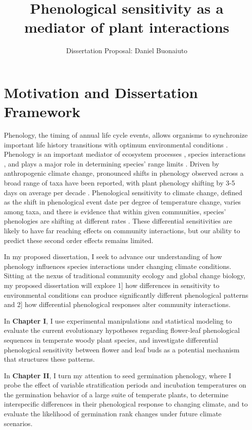 \documentclass[12pt]{article}\usepackage[]{graphicx}\usepackage[]{color}
\begin{document}
\title{Phenological sensitivity as a mediator of plant interactions}
\author{Dissertation Proposal: Daniel Buonaiuto}
\maketitle{}
\section*{Motivation and Dissertation Framework}
\indent\indent Phenology, the timing of annual life cycle events, allows organisms to synchronize important life history transitions with optimum environmental conditions \citep{Forrest2010}. Phenology is an important mediator of ecosystem processes \citep{Piao2007,Cleland2007}, species interactions \citep{Yang2010,Leverett2017}, and plays a major role in determining species' range limits \citep{Chuine2001}. Driven by anthropogenic climate change, pronounced shifts in phenology observed across a broad range of taxa have been reported, with plant phenology shifting by 3-5 days on average per decade \citep{Parmesan2003,Menzel2006,Root2003}. Phenological sensitivity to climate change, defined as the shift in phenological event date per degree of temperature change, varies among taxa, and there is evidence that within given communities, species' phenologies are shifting at different rates \citep{Cleland2012,Ovaskainen2013}. These differential sensitivities are likely to have far reaching effects on community interactions, but our ability to predict these second order effects remains limited.
\par In my proposed dissertation, I seek to advance our understanding of how phenology influences species interactions under changing climate conditions. Sitting at the nexus of traditional community ecology and global change biology, my proposed dissertation will explore 1] how differences in sensitivity to environmental conditions can produce significantly different phenological patterns and 2] how differential phenological responses alter community interactions.
\par In \textbf{Chapter I}, I use experimental manipulations and statistical modeling to evaluate the current evolutionary hypotheses regarding flower-leaf phenological sequences in temperate woody plant species, and investigate differential phenological sensitivity between flower and leaf buds as a potential mechanism that structures these patterns.
\par In \textbf{Chapter II}, I turn my attention to seed germination phenology, where I probe the effect of variable stratification periods and incubation temperatures on the germination behavior of a large suite of temperate plants, to determine interspecific differences in their phenological response to changing climate, and to evaluate the likelihood of germination rank changes under future climate scenarios.
\end{document}

